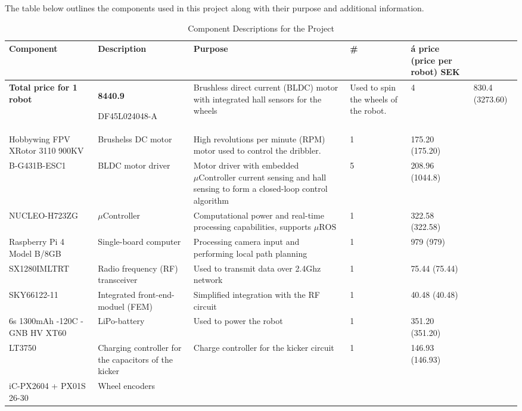 \documentclass[a4paper,4pt]{article}
\begin{document}
  The table below outlines the components used in this project along
  with their purpose and additional information.
  \begin{center}
    \begin{longtable}{|p{3cm}|p{3cm}|p{3cm}|p{1cm}|p{2cm}| }
      \caption{Component Descriptions for the Project}
      \label{tab:component_bom}
      \\ \hline {} \textbf{Component} &
      \textbf{Description} & \textbf{Purpose} & \textbf{\#} & \textbf{á
        price (price per robot) SEK}\\ \endhead \hline

       \textbf{Total price for 1 robot} &
      \textbf{8440.9} \endlastfoot \hline

      DF45L024048-A & Brushless direct current (BLDC) motor with
      integrated hall sensors for the wheels & Used to spin the wheels
      of the robot. & 4 & 830.4 (3273.60)\\ \hline Hobbywing FPV XRotor
      3110 900KV & Brushelss DC motor & High revolutions per minute
      (RPM) motor used to control the dribbler. & 1 & 175.20 (175.20) \\
      \hline B-G431B-ESC1 & BLDC motor driver & Motor driver with
      embedded $\mu\text{Controller}$ current sensing and hall sensing
      to form a closed-loop control algorithm & 5 & 208.96 (1044.8) \\
      \hline NUCLEO-H723ZG & $\mu\text{Controller}$ & Computational
      power and real-time processing capabilities, supports
      $\mu\text{ROS}$ & 1 & 322.58 (322.58) \\ \hline Raspberry Pi 4
      Model B/8GB & Single-board computer & Processing camera input and
      performing local path planning & 1 & 979 (979) \\ \hline
      SX1280IMLTRT & Radio frequency (RF) transceiver & Used to transmit
      data over 2.4Ghz network & 1 & 75.44 (75.44) \\ \hline SKY66122-11
      & Integrated front-end-moduel (FEM) & Simplified integration with
      the RF circuit & 1 & 40.48 (40.48) \\ \hline 6s 1300mAh -120C -
      GNB HV XT60 & LiPo-battery & Used to power the robot & 1 & 351.20
      (351.20) \\ \hline LT3750 & Charging controller for the capacitors
      of the kicker & Charge controller for the kicker circuit & 1 &
      146.93 (146.93)\\ \hline iC-PX2604 + PX01S 26-30 & Wheel encoders

\end{longtable}
\end{center}
\end{document}
